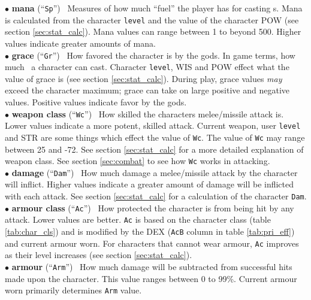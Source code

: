 $\bullet$ {\bf mana} (``{\tt Sp}'')
 \emdash\ Measures of how much ``fuel'' the player
has for casting \incantation s.  Mana is calculated from the character 
{\tt level}
and the value of the character POW (see section \ref{sec:stat_calc}). 
Mana values can range between 1 to beyond 
500. Higher values indicate greater amounts of mana. \\ 

$\bullet$ {\bf grace} (``{\tt Gr}'')
 \emdash\
How favored the character is by the gods. In game terms, how much 
\divinemagic\ a character can cast. Character {\tt level}, WIS and POW effect 
what the value of grace is (see section
\ref{sec:stat_calc}).  During play, grace values 
{\em may} exceed the character maximum; grace can take on large positive
and negative values. Positive values indicate favor by the gods.\\

$\bullet$ {\bf weapon class} (``{\tt Wc}'')
 \emdash\ 
How skilled the characters melee/missile attack is. Lower values indicate a 
more potent, skilled attack. Current weapon, user {\tt level} and STR are some 
things which effect the value of {\tt Wc}. The value of {\tt Wc} may 
range between 25 and -72. 
See section \ref{sec:stat_calc} for a more detailed explanation of weapon 
class. See section \ref{sec:combat} to see how {\tt Wc} works in attacking.\\ 

$\bullet$ {\bf damage}\index{damage} (``{\tt Dam}'')\index{stats, Dam}
 \emdash\ How much 
damage a melee/missile attack by the character will inflict. Higher values 
indicate a greater amount of damage will be inflicted with each attack. 
See section \ref{sec:stat_calc} for a calculation of the character {\tt Dam}. 
\\ 

$\bullet$ {\bf armour class} 
(``{\tt Ac}'') \emdash\ How 
protected the character is from being hit by any attack. Lower values 
are better. {\tt Ac} is based on the character class (table \ref{tab:char_cls}) 
and is modified by the DEX ({\tt AcB} column in table \ref{tab:pri_eff}) and 
current armour worn. For characters that cannot wear armour, {\tt Ac} improves
as their level increases (see section \ref{sec:stat_calc}). \\ 

$\bullet$ {\bf armour}\index{armour} (``{\tt Arm}'') 
\emdash\ 
How much damage will be subtracted from successful hits made upon 
the character. This value ranges between 0 to 99\%. Current armour worn 
primarily determines {\tt Arm} value. \\ 

